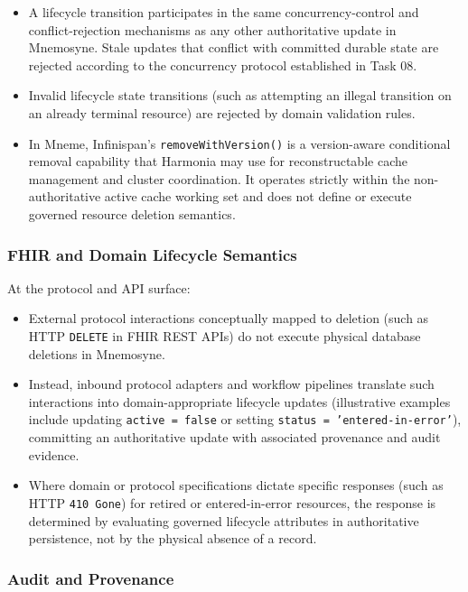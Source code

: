 \begin{itemize}
    \item A lifecycle transition participates in the same concurrency-control and conflict-rejection mechanisms as any other authoritative update in Mnemosyne. Stale updates that conflict with committed durable state are rejected according to the concurrency protocol established in Task 08.
    \item Invalid lifecycle state transitions (such as attempting an illegal transition on an already terminal resource) are rejected by domain validation rules.
    \item In Mneme, Infinispan's \texttt{removeWithVersion()} is a version-aware conditional removal capability that Harmonia may use for reconstructable cache management and cluster coordination. It operates strictly within the non-authoritative active cache working set and does not define or execute governed resource deletion semantics.
\end{itemize}

\subsubsection{FHIR and Domain Lifecycle Semantics}

At the protocol and API surface:

\begin{itemize}
    \item External protocol interactions conceptually mapped to deletion (such as HTTP \texttt{DELETE} in FHIR REST APIs) do not execute physical database deletions in Mnemosyne.
    \item Instead, inbound protocol adapters and workflow pipelines translate such interactions into domain-appropriate lifecycle updates (illustrative examples include updating \texttt{active = false} or setting \texttt{status = 'entered-in-error'}), committing an authoritative update with associated provenance and audit evidence.
    \item Where domain or protocol specifications dictate specific responses (such as HTTP \texttt{410 Gone}) for retired or entered-in-error resources, the response is determined by evaluating governed lifecycle attributes in authoritative persistence, not by the physical absence of a record.
\end{itemize}

\subsubsection{Audit and Provenance}

